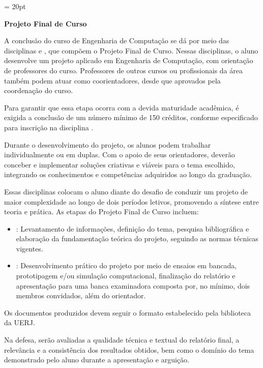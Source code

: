 \documentclass[12pt,a4paper]{article}
\begin{document}
\thispagestyle{firstpage} %
\headsep = 20pt
\setlength{\tabcolsep}{5pt} %
\vspace*{2.0cm}

\pagestyle{plain} %

\begin{center}
  \textbf{\LARGE Projeto Final de Curso}
\end{center}
\vspace*{0.5cm}

A conclusão do curso de Engenharia de Computação se dá por meio das disciplinas \textbf{\ProjA} e \textbf{\ProjB}, que compõem o Projeto Final de Curso. Nessas disciplinas, o aluno desenvolve um projeto aplicado em Engenharia de Computação, com orientação de professores do curso. Professores de outros cursos ou profissionais da área também podem atuar como coorientadores, desde que aprovados pela coordenação do curso.

Para garantir que essa etapa ocorra com a devida maturidade acadêmica, é exigida a conclusão de um número mínimo de 150 créditos, conforme especificado para inscrição na disciplina \textbf{\ProjA}.

Durante o desenvolvimento do projeto, os alunos podem trabalhar individualmente ou em duplas. Com o apoio de seus orientadores, deverão conceber e implementar soluções criativas e viáveis para o tema escolhido, integrando os conhecimentos e competências adquiridos ao longo da graduação.

Essas disciplinas colocam o aluno diante do desafio de conduzir um projeto de maior complexidade ao longo de dois períodos letivos, promovendo a síntese entre teoria e prática. As etapas do Projeto Final de Curso incluem:

\begin{itemize}
  \item \textbf{\ProjA}: Levantamento de informações, definição do tema, pesquisa bibliográfica e elaboração da fundamentação teórica do projeto, seguindo as normas técnicas vigentes.
  \item \textbf{\ProjB}: Desenvolvimento prático do projeto por meio de ensaios em bancada, prototipagem e/ou simulação computacional, finalização do relatório e apresentação para uma banca examinadora composta por, no mínimo, dois membros convidados, além do orientador.
\end{itemize}

Os documentos produzidos devem seguir o formato estabelecido pela biblioteca da UERJ.

Na defesa, serão avaliadas a qualidade técnica e textual do relatório final, a relevância e a consistência dos resultados obtidos, bem como o domínio do tema demonstrado pelo aluno durante a apresentação e arguição.
\end{document}

